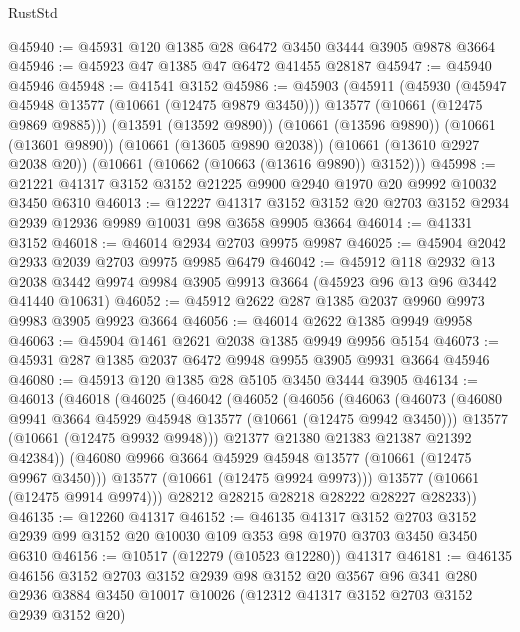 \begin{lexlean}{RustStd}
\begin{coremodule}
@45940 := @45931 @120 @1385 @28 @6472 @3450 @3444 @3905 @9878 @3664
@45946 := @45923 @47 @1385 @47 @6472 @41455 @28187
@45947 := @45940 @45946
@45948 := @41541 @3152
@45986 := @45903
    (@45911
      (@45930
        (@45947 @45948 @13577 (@10661 (@12475 @9879 @3450)))
        @13577
        (@10661 (@12475 @9869 @9885)))
      (@13591 (@13592 @9890))
      (@10661 (@13596 @9890))
      (@10661 (@13601 @9890))
      (@10661 (@13605 @9890 @2038))
      (@10661 (@13610 @2927 @2038 @20))
      (@10661 (@10662 (@10663 (@13616 @9890)) @3152)))
@45998 := @21221 @41317 @3152 @3152 @21225 @9900 @2940 @1970 @20 @9992 @10032 @3450 @6310
@46013 := @12227
    @41317
    @3152
    @3152
    @20
    @2703
    @3152
    @2934
    @2939
    @12936
    @9989
    @10031
    @98
    @3658
    @9905
    @3664
@46014 := @41331 @3152
@46018 := @46014 @2934 @2703 @9975 @9987
@46025 := @45904 @2042 @2933 @2039 @2703 @9975 @9985 @6479
@46042 := @45912
    @118
    @2932
    @13
    @2038
    @3442
    @9974
    @9984
    @3905
    @9913
    @3664
    (@45923 @96 @13 @96 @3442 @41440 @10631)
@46052 := @45912 @2622 @287 @1385 @2037 @9960 @9973 @9983 @3905 @9923 @3664
@46056 := @46014 @2622 @1385 @9949 @9958
@46063 := @45904 @1461 @2621 @2038 @1385 @9949 @9956 @5154
@46073 := @45931 @287 @1385 @2037 @6472 @9948 @9955 @3905 @9931 @3664 @45946
@46080 := @45913 @120 @1385 @28 @5105 @3450 @3444 @3905
@46134 := @46013
    (@46018
      (@46025
        (@46042
          (@46052
            (@46056
              (@46063
                (@46073
                  (@46080 @9941 @3664 @45929 @45948 @13577 (@10661 (@12475 @9942 @3450)))
                  @13577
                  (@10661 (@12475 @9932 @9948)))
                @21377
                @21380
                @21383
                @21387
                @21392
                @42384))
            (@46080 @9966 @3664 @45929 @45948 @13577 (@10661 (@12475 @9967 @3450)))
            @13577
            (@10661 (@12475 @9924 @9973)))
          @13577
          (@10661 (@12475 @9914 @9974)))
        @28212
        @28215
        @28218
        @28222
        @28227
        @28233))
@46135 := @12260 @41317
@46152 := @46135
    @41317
    @3152
    @2703
    @3152
    @2939
    @99
    @3152
    @20
    @10030
    @109
    @353
    @98
    @1970
    @3703
    @3450
    @3450
    @6310
@46156 := @10517 (@12279 (@10523 @12280)) @41317
@46181 := @46135
    @46156
    @3152
    @2703
    @3152
    @2939
    @98
    @3152
    @20
    @3567
    @96
    @341
    @280
    @2936
    @3884
    @3450
    @10017
    @10026
    (@12312 @41317 @3152 @2703 @3152 @2939 @3152 @20)

\end{coremodule}
\end{lexlean}
